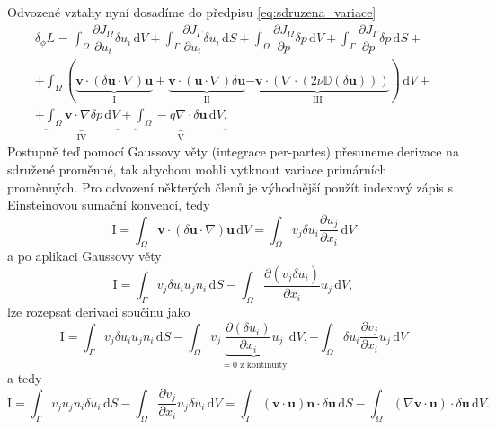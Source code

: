 Odvozené vztahy nyní dosadíme do předpisu \ref{eq:sdruzena_variace}
\begin{multline}
\delta_\phi L = 
\int_{\Omega} \dfrac{\partial J_{\Omega}}{\partial u_i} \delta u_i \, \mathrm{d}V 
+ 
\int_{\Gamma} \dfrac{\partial J_{\Gamma}}{\partial u_i} \delta u_i \, \mathrm{d}S
+
\int_{\Omega} \dfrac{\partial J_{\Omega}}{\partial p} \delta p  \, \mathrm{d}V 
+ 
\int_{\Gamma} \dfrac{\partial J_{\Gamma}}{\partial p} \delta p  \, \mathrm{d}S
+\\+
\int_{\Omega} 
		\left(
		\underbrace{\mathbf{v} \cdot(\delta \mathbf{u}\cdot \nabla )\mathbf{u}}_\mathrm{I}
		+ \underbrace{\mathbf{v} \cdot(\mathbf{u}\cdot \nabla )\delta\mathbf{u}}_\mathrm{II}
		\underbrace{ - \mathbf{v} \cdot (\nabla \cdot (2\nu \mathbb{D}(\delta \mathbf{u}) ))}_\mathrm{III}
		\right)
\, \mathrm{d}V
+\\+
\underbrace{
\int_{\Omega} 
 \mathbf{v} \cdot \nabla \delta p
\, \mathrm{d}V
}_\mathrm{IV}
+
\underbrace{
\int_{\Omega} 
  - q \nabla \cdot \delta \mathbf{u}
\, \mathrm{d}V.
}_\mathrm{V} 
\end{multline}
Postupně teď pomocí Gaussovy věty (integrace per-partes) přesuneme derivace na sdružené proměnné, tak abychom mohli vytknout variace primárních proměnných. Pro odvození některých členů je výhodnější použít indexový zápis s Einsteinovou sumační konvencí, tedy
\begin{equation}
\mathrm{I}
=
\int_{\Omega} 
\mathbf{v}\cdot(\delta\mathbf{u}\cdot \nabla)\mathbf{u}
\, \mathrm{d}V
=
\int_{\Omega} 
v_j \delta u_i \frac{\partial u_j}{\partial x_i}
\, \mathrm{d}V
\end{equation}
a po aplikaci Gaussovy věty
\begin{equation}
\mathrm{I}
=
\int_{\Gamma} 
v_j \delta u_i u_j n_i
\, \mathrm{d}S
-
\int_{\Omega} 
\frac{\partial( v_j \delta u_i )}{\partial x_i}u_j
\, \mathrm{d}V,
\end{equation}
lze rozepsat derivaci součinu jako
\begin{equation}
\mathrm{I}
=
\int_{\Gamma} 
v_j \delta u_i u_j n_i
\, \mathrm{d}S
-
\int_{\Omega} 
v_j\underbrace{\frac{\partial( \delta u_i )}{\partial x_i}u_j}_{=0 \text{ z kontinuity} }
\, \mathrm{d}V,
-
\int_{\Omega} 
\delta u_i \frac{\partial v_j  }{\partial x_i}u_j
\, \mathrm{d}V
\end{equation} 
a tedy
\begin{equation}\label{eq:clen_I}
\mathrm{I}
=
\int_{\Gamma} 
v_j u_j n_i \delta u_i 
\, \mathrm{d}S
-
\int_{\Omega} 
\frac{\partial v_j  }{\partial x_i} u_j \delta u_i
\, \mathrm{d}V
=
\int_{\Gamma} 
(\mathbf{v}\cdot \mathbf{u} )\mathbf{n} \cdot \delta\mathbf{u}
\, \mathrm{d}S
-
\int_{\Omega} 
(\nabla \mathbf{v}\cdot \mathbf{u})\cdot\delta \mathbf{u}
\, \mathrm{d}V.
\end{equation}
